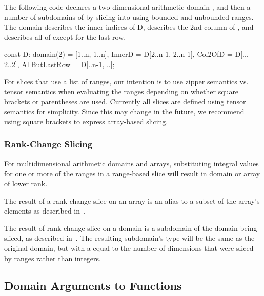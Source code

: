 \begin{example}
The following code declares a two dimensional arithmetic
domain , and then a number of subdomains of  by
slicing into  using bounded and unbounded ranges.
The  domain describes the inner indices of
D,  describes the 2nd column of
, and  describes all of  except
for the last row.

\begin{chapel}
const D: domain(2) = [1..n, 1..n],
      InnerD = D[2..n-1, 2..n-1],
      Col2OfD = D[.., 2..2],
      AllButLastRow = D[..n-1, ..];
\end{chapel}
\end{example}

\begin{openissue}
For slices that use a list of ranges, our intention is to use zipper
semantics vs. tensor semantics when evaluating the ranges depending on
whether square brackets or parentheses are used.  Currently all slices
are defined using tensor semantics for simplicity.  Since this may
change in the future, we recommend using square brackets to express
array-based slicing.
\end{openissue}

\subsubsection{Rank-Change Slicing}
\label{Rank_Change_Slicing}

For multidimensional arithmetic domains and arrays, substituting
integral values for one or more of the ranges in a range-based slice
will result in domain or array of lower rank.

The result of a rank-change slice on an array is an alias to a subset
of the array's elements as described
in~.

The result of rank-change slice on a domain is a subdomain of the
domain being sliced, as described in~.  The resulting
subdomain's type will be the same as the original domain, but with
a  equal to the number of dimensions that were sliced by
ranges rather than integers.


\subsection{Domain Arguments to Functions}
\label{Domain_Arguments_to_Functions}

